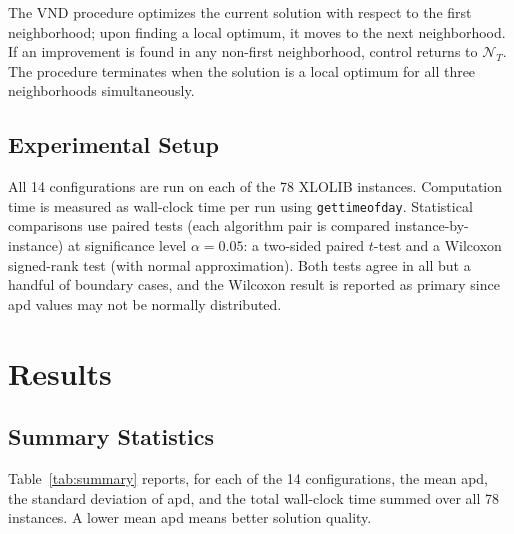 \documentclass[11pt,a4paper]{article}
\begin{document}
The VND procedure optimizes the current solution with respect to the
first neighborhood; upon finding a local optimum, it moves to the next
neighborhood.  If an improvement is found in any non-first neighborhood,
control returns to $\mathcal{N}_T$.  The procedure terminates when the
solution is a local optimum for all three neighborhoods simultaneously.

\subsection{Experimental Setup}

All 14 configurations are run on each of the 78 XLOLIB instances.
Computation time is measured as wall-clock time per run using
\texttt{gettimeofday}.  Statistical comparisons use paired tests (each
algorithm pair is compared instance-by-instance) at significance level
$\alpha = 0.05$: a two-sided paired $t$-test and a Wilcoxon signed-rank
test (with normal approximation).  Both tests agree in all but a handful
of boundary cases, and the Wilcoxon result is reported as primary since
apd values may not be normally distributed.

\section{Results}
\label{sec:results}

\subsection{Summary Statistics}

Table~\ref{tab:summary} reports, for each of the 14 configurations, the
mean apd, the standard deviation of apd, and the total wall-clock time
summed over all 78 instances.  A lower mean apd means better solution
quality.
\end{document}
